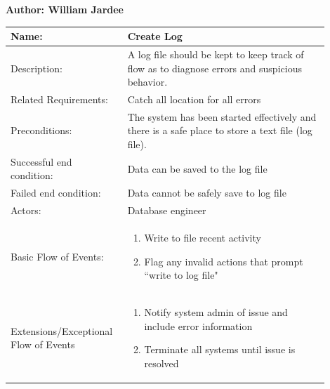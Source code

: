 \documentclass[11pt]{article}
\begin{document}
\begin{table}[!ht]
\begin{center}
\textbf{Author: William Jardee}
\vspace*{1em}

\begin{tabular}{p{0.30\linewidth}p{0.60\linewidth}}
	Name: & Create Log\\\hline
	Description: & A log file should be kept to keep track of flow as to diagnose errors and suspicious behavior.\\\hline
	Related Requirements:& Catch all location for all errors\\\hline
	Preconditions:& The system has been started effectively and there is a safe place to store a text file (log file).\\\hline
	Successful end condition:& Data can be saved to the log file\\\hline
	Failed end condition:& Data cannot be safely save to log file\\\hline
	Actors:& Database engineer \\\hline
	Basic Flow of Events: & \begin{enumerate}
	\item Write to file recent activity
	\item Flag any invalid actions that prompt ``write to log file"
	\end{enumerate}\\\hline
	Extensions/Exceptional Flow of Events & \begin{enumerate}
	\item Notify system admin of issue and include error information
	\item Terminate all systems until issue is resolved
	\end{enumerate}
\end{tabular}
\label{des:create_log}
\end{center}
\end{table}
\end{document}
